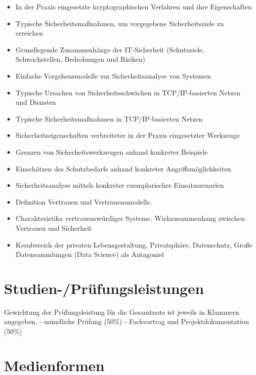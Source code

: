 \begin{itemize}
\tightlist
\item
  In der Praxis eingesetzte kryptographischen Verfahren und ihre
  Eigenschaften
\item
  Typische Sicherheitsmaßnahmen, um vorgegebene Sicherheitsziele zu
  erreichen
\item
  Grundlegende Zusammenhänge der IT-Sicherheit (Schutzziele,
  Schwachstellen, Bedrohungen und Risiken)
\item
  Einfache Vorgehensmodelle zur Sicherheitsanalyse von Systemen
\item
  Typische Ursachen von Sicherheitsschwächen in TCP/IP-basierten Netzen
  und Diensten
\item
  Typische Sicherheitsmaßnahmen in TCP/IP-basierten Netzen
\item
  Sicherheitseigenschaften verbreiteter in der Praxis eingesetzter
  Werkzeuge
\item
  Grenzen von Sicherheitswerkzeugen anhand konkreter Beispiele
\item
  Einschätzen des Schutzbedarfs anhand konkreter Angriffsmöglichkeiten
\item
  Sicherheitsanalyse mittels konkreter exemplarischer Einsatzszenarien
\item
  Definition Vertrauen und Vertrauensmodelle.
\item
  Charakteristika vertrauenswürdiger Systeme. Wirkzusammenhang zwischen
  Vertrauen und Sicherheit
\item
  Kernbereich der privaten Lebensgestaltung, Privatsphäre, Datenschutz,
  Große Datensammlungen (Data Science) als Antagonist
\end{itemize}

\section*{Studien-/Prüfungsleistungen\label{/mi-2017/modulbeschreibungen-master/MA_WTW_Modul_IT-Sicherheit}}\label{studien-pruxfcfungsleistungenpathlabelmi-2017modulbeschreibungen-mastermaux5fwtwux5fmodulux5fit-sicherheit}

Gewichtung der Prüfungsleistung für die Gesamtnote ist jeweils in
Klammern angegeben. - mündliche Prüfung (50\%) - Fachvortrag und
Projektdokumentation (50\%)

\section*{Medienformen\label{/mi-2017/modulbeschreibungen-master/MA_WTW_Modul_IT-Sicherheit}}\label{medienformenpathlabelmi-2017modulbeschreibungen-mastermaux5fwtwux5fmodulux5fit-sicherheit}

